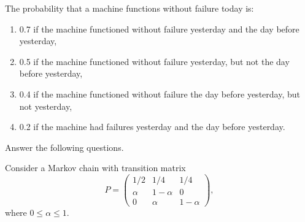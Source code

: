 \documentclass[12pt]{exam}
\begin{document}
\begin{questions}
\question[20]
The probability that a machine functions without failure today is:
\begin{enumerate}\renewcommand{\labelenumi}{\roman{enumi})}
\item 0.7 if the machine functioned without failure yesterday and the day before yesterday,
\item 0.5 if the machine functioned without failure yesterday, but not the day before yesterday,
\item 0.4 if the machine functioned without failure the day before yesterday, but not yesterday,
\item 0.2 if the machine had failures yesterday and the day before yesterday.
\end{enumerate}
Answer the following questions.

\question[15]
Consider a Markov chain with transition matrix
\[
P=
\begin{pmatrix}
1/2 & 1/4 & 1/4 \\
\alpha & 1-\alpha & 0 \\
0 & \alpha & 1-\alpha
\end{pmatrix},
\]
where $0\leq\alpha\leq 1$. 
\begin{parts}

\end{parts}
\end{questions}
\end{document}
